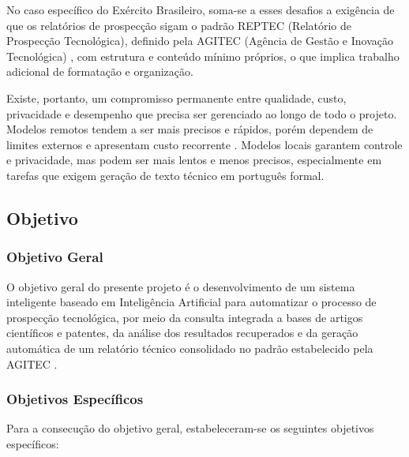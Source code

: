 \documentclass[12pt, a4paper]{article}
\begin{document}
  No caso específico do Exército Brasileiro, soma-se a esses desafios a
exigência de que os relatórios de prospecção sigam o padrão REPTEC (Relatório
de Prospecção Tecnológica), definido pela AGITEC (Agência de Gestão e Inovação
Tecnológica) \cite{agitec2024}, com estrutura e conteúdo mínimo próprios, o que
implica trabalho adicional de formatação e organização.

  Existe, portanto, um compromisso permanente entre qualidade, custo, privacidade
e desempenho que precisa ser gerenciado ao longo de todo o projeto. Modelos
remotos tendem a ser mais precisos e rápidos, porém dependem de limites externos
e apresentam custo recorrente \cite{brown2020}. Modelos locais garantem controle
e privacidade, mas podem ser mais lentos e menos precisos, especialmente em
tarefas que exigem geração de texto técnico em português formal.

  \subsection{Objetivo}

    \subsubsection*{Objetivo Geral}

  O objetivo geral do presente projeto é o desenvolvimento de um sistema
inteligente baseado em Inteligência Artificial para automatizar o processo de
prospecção tecnológica, por meio da consulta integrada a bases de artigos
científicos e patentes, da análise dos resultados recuperados e da geração
automática de um relatório técnico consolidado no padrão estabelecido pela
AGITEC \cite{agitec2024}.

    \subsubsection*{Objetivos Específicos}

  Para a consecução do objetivo geral, estabeleceram-se os seguintes objetivos
específicos:
\end{document}
